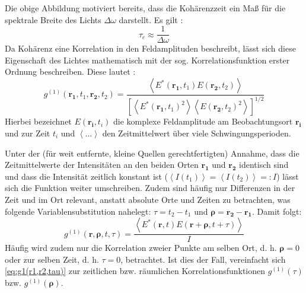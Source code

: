 Die obige Abbildung motiviert bereits, dass die Kohärenzzeit ein Maß für die spektrale Breite des Lichts $\Delta \omega$ darstellt. 
Es gilt \cite{foxQuantumOpticsIntroduction2006}:
\begin{equation}
    \tau_c  \approx \frac{1}{\Delta \omega}
    \label{eq:tau(delta nu)}
\end{equation}
Da Kohärenz eine Korrelation in den Feldamplituden beschreibt, lässt sich diese Eigenschaft des Lichtes mathematisch mit der sog. Korrelationsfunktion erster Ordnung beschreiben. 
Diese lautet \cite{foellmiIntensityInterferometrySecondorder2009}:
\begin{equation}
    g^{(1)}(\mathbf{r_1}, t_1, \mathbf{r_2}, t_2) = \frac{\left<E^*(\mathbf{r_1}, t_1)E(\mathbf{r_2}, t_2)\right>}{\left[\left<E^*(\mathbf{r_1}, t_1)^2\right> \left<E(\mathbf{r_2}, t_2)^2\right>\right]^{1/2}}
    \label{eq:g1(r1,t1,r2,t2)}
\end{equation}
Hierbei bezeichnet $E(\mathbf{r_i},t_i)$ die komplexe Feldamplitude am Beobachtungsort $\mathbf{r_i}$ und zur Zeit $t_i$ und $\left<\dots\right>$ den Zeitmittelwert über viele Schwingungsperioden. 

Unter der (für weit entfernte, kleine Quellen gerechtfertigten) Annahme, dass die Zeitmittelwerte der Intensitäten an den beiden Orten $\mathbf{r_1}$ und $\mathbf{r_2}$ identisch sind und dass die Intensität zeitlich konstant ist ($\left<I(t_1)\right>=\left<I(t_2)\right>=:I$) lässt sich die Funktion weiter umschreiben. 
Zudem sind häufig nur Differenzen in der Zeit und im Ort relevant, anstatt absolute Orte und Zeiten zu betrachten, was folgende Variablensubstitution nahelegt: $\tau = t_2 -t_1$ und $\bm{\rho} = \mathbf{r_2} - \mathbf{r_1}$. 
Damit folgt:
\begin{equation}
    g^{(1)}(\mathbf{r}, \bm{\rho}, t, \tau) = \frac{\left<E^*(\mathbf{r}, t)E(\mathbf{r}+\bm{\rho}, t+\tau)\right>}{I}
    \label{eq:g1(r1,r2,tau)}
\end{equation}
Häufig wird zudem nur die Korrelation zweier Punkte am selben Ort, d. h. $\bm{\rho}=0$ oder zur selben Zeit, d. h. $\tau=0$, betrachtet. 
Ist dies der Fall, vereinfacht sich \autoref{eq:g1(r1,r2,tau)} zur zeitlichen bzw. räumlichen Korrelationsfunktionen $g^{(1)}(\tau)$ bzw. $g^{(1)}(\bm{\rho})$.


